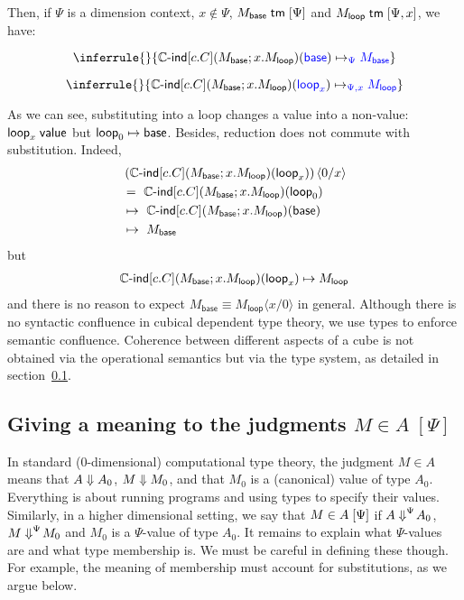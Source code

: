 \documentclass{article}
\newcommand\Circle{\mathbb{C}}
\newcommand\Base{\mathsf{base}}
\newcommand\Loop{\mathsf{loop}}
\newcommand\CIndOp{\Circle\textsf{-ind}}
\newcommand\CInd[4]{\CIndOp\Squares{#1}\Parens*{#2;#3}\Parens{#4}}
\newcommand\DimSubst[3]{#3\langle{#1}/{#2}\rangle}
\DeclarePairedDelimiter\Parens{\lparen}{\rparen}
\DeclarePairedDelimiter\Squares{[}{]}
\begin{document}
\medskip

\noindent Then, if $\Psi$ is a dimension context, $x \notin \Psi$, 
$\isTm{M_{\Base}}{\Psi}$ and $\isTm{M_{\Loop}}{\Psi, x}$, we have:

\[
\inferrule{}{
  \stepDim{
    \CInd{c.C}{M_{\Base}}{x.M_{\Loop}}{\colored{\Base}}
  }{
    \colored{M_{\Base}}
  }{\colored{\Psi}}
}
\]


\[
\inferrule{}{
  \stepDim{
    \CInd{c.C}{M_{\Base}}{x.M_{\Loop}}{\colored{\Loop_x}}
  }{
    \colored{M_{\Loop}}
  }{\colored{\Psi, x}}
}
\]

\bigskip

As we can see, substituting into a loop changes a value into a non-value: 
$\valueJ{\Loop_x}$ but $\step{\Loop_0}{\Base}$. Besides, reduction does not 
commute with substitution. Indeed,
\begin{align*}
  & \DimSubst{0}{x}{\left(\CInd{c.C}{M_{\Base}}{x.M_{\Loop}}{\Loop_x}\right)} \\
  &= \ \CInd{c.C}{M_{\Base}}{x.M_{\Loop}}{\Loop_0} \\
  &\mapsto \ \CInd{c.C}{M_{\Base}}{x.M_{\Loop}}{\Base} \\
  &\mapsto \ M_{\Base}
\end{align*}
but
\begin{align*}
  \step{  \CInd{c.C}{M_{\Base}}{x.M_{\Loop}}{\Loop_x}  }{ M_{\Loop}  }
\end{align*}
and there is no reason to expect
$M_{\Base} \equiv \DimSubst{x}{0}{M_{\Loop}}$ in general.  Although
there is no syntactic confluence in cubical dependent type theory, we
use types to enforce semantic confluence. Coherence between different
aspects of a cube is not obtained via the operational semantics but
via the type system, as detailed in section~\ref{sec:meaning}.



\subsection{Giving a meaning to the judgments $M \in A \;[\Psi]$}
\label{sec:meaning}

In standard ($0$-dimensional) computational type theory, the judgment
$M \in A$ means that $A \mathrel{\Downarrow} A_0$, $M \mathrel{\Downarrow} M_0$, and that $M_0$ is a
(canonical) value of type $A_0$. Everything is about running programs and
using types to specify their values. Similarly, in a higher dimensional setting,
we say that $M \in A \; [\Psi]$ if $A \mathrel{\Downarrow}^{\Psi}\! A_0$, 
$M \mathrel{\Downarrow}^{\Psi}\! M_0$ and $M_0$ is a $\Psi$-value of type $A_0$. It remains to
explain what $\Psi$-values are and what type membership is. We must be careful
in defining these though. For example, the meaning of membership must account for
substitutions, as we argue below.
\end{document}
